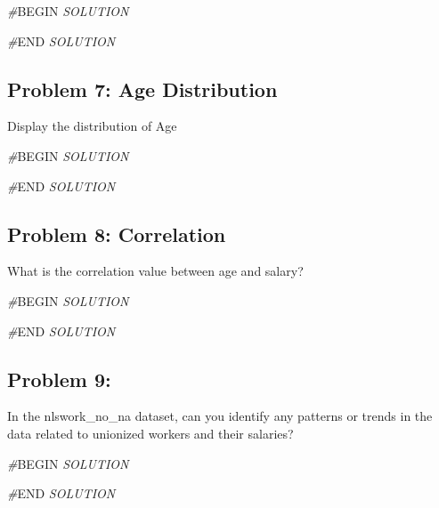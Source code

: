 \documentclass[
]{article}
\newenvironment{Shaded}{\begin{snugshade}}{\end{snugshade}}
\newcommand{\CommentTok}[1]{\textcolor[rgb]{0.56,0.35,0.01}{\textit{#1}}}
\newcommand{\RegionMarkerTok}[1]{#1}
\begin{document}
\begin{Shaded}
\begin{Highlighting}[]
\CommentTok{\#}\RegionMarkerTok{BEGIN}\CommentTok{ SOLUTION}

\CommentTok{\#}\RegionMarkerTok{END}\CommentTok{ SOLUTION}
\end{Highlighting}
\end{Shaded}

\hypertarget{problem-7-age-distribution}{%
\subsection{Problem 7: Age
Distribution}\label{problem-7-age-distribution}}

Display the distribution of Age

\begin{Shaded}
\begin{Highlighting}[]
\CommentTok{\#}\RegionMarkerTok{BEGIN}\CommentTok{ SOLUTION}

\CommentTok{\#}\RegionMarkerTok{END}\CommentTok{ SOLUTION}
\end{Highlighting}
\end{Shaded}

\hypertarget{problem-8-correlation}{%
\subsection{Problem 8: Correlation}\label{problem-8-correlation}}

What is the correlation value between age and salary?

\begin{Shaded}
\begin{Highlighting}[]
\CommentTok{\#}\RegionMarkerTok{BEGIN}\CommentTok{ SOLUTION}

\CommentTok{\#}\RegionMarkerTok{END}\CommentTok{ SOLUTION}
\end{Highlighting}
\end{Shaded}

\hypertarget{problem-9}{%
\subsection{Problem 9:}\label{problem-9}}

In the nlswork\_no\_na dataset, can you identify any patterns or trends
in the data related to unionized workers and their salaries?

\begin{Shaded}
\begin{Highlighting}[]
\CommentTok{\#}\RegionMarkerTok{BEGIN}\CommentTok{ SOLUTION}

\CommentTok{\#}\RegionMarkerTok{END}\CommentTok{ SOLUTION}
\end{Highlighting}
\end{Shaded}
\end{document}
